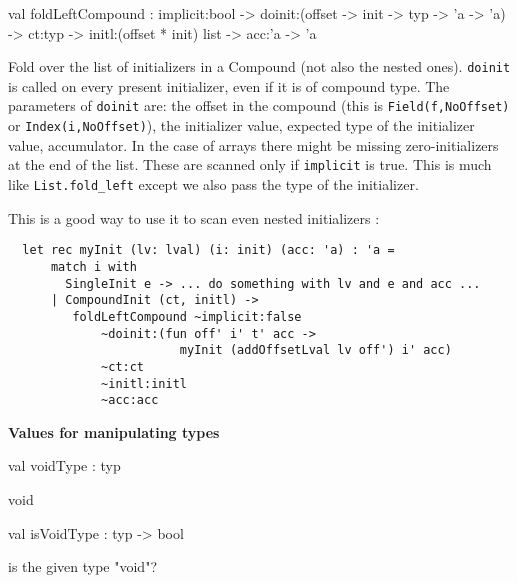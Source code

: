 \documentclass[11pt]{article}
\begin{document}
\label{val:Cil.foldLeftCompound}\begin{ocamldoccode}
val foldLeftCompound :
  implicit:bool ->
  doinit:(offset -> init -> typ -> 'a -> 'a) ->
  ct:typ -> initl:(offset * init) list -> acc:'a -> 'a
\end{ocamldoccode}
\begin{ocamldocdescription}
Fold over the list of initializers in a Compound (not also the nested 
 ones). {\tt{doinit}} is called on every present initializer, even if it is of 
 compound type. The parameters of {\tt{doinit}} are: the offset in the compound 
 (this is {\tt{Field(f,NoOffset)}} or {\tt{Index(i,NoOffset)}}), the initializer 
 value, expected type of the initializer value, accumulator. In the case of 
 arrays there might be missing zero-initializers at the end of the list. 
 These are scanned only if {\tt{implicit}} is true. This is much like 
 {\tt{List.fold\_left}} except we also pass the type of the initializer. 


 This is a good way to use it to scan even nested initializers :
\begin{verbatim}
  let rec myInit (lv: lval) (i: init) (acc: 'a) : 'a = 
      match i with 
        SingleInit e -> ... do something with lv and e and acc ...
      | CompoundInit (ct, initl) ->  
         foldLeftCompound ~implicit:false
             ~doinit:(fun off' i' t' acc -> 
                        myInit (addOffsetLval lv off') i' acc)
             ~ct:ct
             ~initl:initl
             ~acc:acc\end{verbatim}


\end{ocamldocdescription}




{\bf Values for manipulating types}



\label{val:Cil.voidType}\begin{ocamldoccode}
val voidType : typ
\end{ocamldoccode}
\begin{ocamldocdescription}
void


\end{ocamldocdescription}




\label{val:Cil.isVoidType}\begin{ocamldoccode}
val isVoidType : typ -> bool
\end{ocamldoccode}
\begin{ocamldocdescription}
is the given type "void"?


\end{ocamldocdescription}
\end{document}
